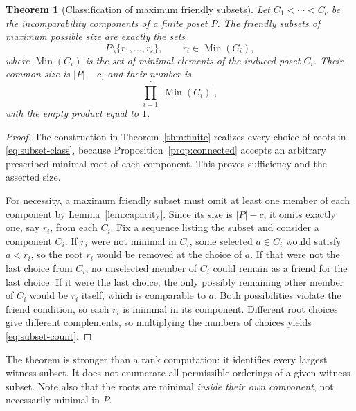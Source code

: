 \documentclass[11pt,letterpaper]{article}
\newtheorem{theorem}{Theorem}[section]
\theoremstyle{definition}
\theoremstyle{remark}
\newcommand{\Min}{\operatorname{Min}}
\begin{document}
\begin{theorem}[Classification of maximum friendly subsets]\label{thm:subsets}
Let $C_1<\cdots<C_c$ be the incomparability components of a finite poset
$P$. The friendly subsets of maximum possible size are exactly the sets
\begin{equation}\label{eq:subset-class}
 P\setminus\{r_1,\ldots,r_c\},\qquad r_i\in\Min(C_i),
\end{equation}
where $\Min(C_i)$ is the set of minimal elements of the induced poset
$C_i$. Their common size is $|P|-c$, and their number is
\begin{equation}\label{eq:subset-count}
 \prod_{i=1}^c|\Min(C_i)|,
\end{equation}
with the empty product equal to $1$.
\end{theorem}
\begin{proof}
The construction in Theorem~\ref{thm:finite} realizes every choice of roots
in \eqref{eq:subset-class}, because Proposition~\ref{prop:connected} accepts
an arbitrary prescribed minimal root of each component. This proves
sufficiency and the asserted size.

For necessity, a maximum friendly subset must omit at least one member of
each component by Lemma~\ref{lem:capacity}. Since its size is $|P|-c$, it
omits exactly one, say $r_i$, from each $C_i$. Fix a sequence listing the
subset and consider a component $C_i$. If $r_i$ were not minimal in $C_i$,
some selected $a\in C_i$ would satisfy $a<r_i$, so the root $r_i$ would be
removed at the choice of $a$. If that were not the last choice from $C_i$,
no unselected member of $C_i$ could remain as a friend for the last choice.
If it were the last choice, the only possibly remaining other member of
$C_i$ would be $r_i$ itself, which is comparable to $a$. Both possibilities
violate the friend condition, so each $r_i$ is minimal in its component.
Different root choices give different complements, so multiplying the
numbers of choices yields \eqref{eq:subset-count}.
\end{proof}

The theorem is stronger than a rank computation: it identifies every largest
witness subset. It does not enumerate all permissible orderings of a given
witness subset. Note also that the roots are minimal \emph{inside their own
component}, not necessarily minimal in $P$.
\end{document}
